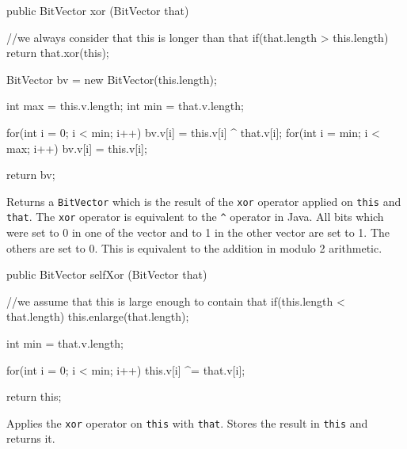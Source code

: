 \begin{code}

   public BitVector xor (BitVector that) \begin{hide} {
      //we always consider that this is longer than that
      if(that.length > this.length)
         return that.xor(this);

      BitVector bv = new BitVector(this.length);

      int max = this.v.length;
      int min = that.v.length;

      for(int i = 0; i < min; i++)
         bv.v[i] = this.v[i] ^ that.v[i];
      for(int i = min; i < max; i++)
         bv.v[i] = this.v[i];

      return bv;
   } \end{hide}
\end{code}
\begin{tabb} Returns a \texttt{BitVector} which is the result of the \texttt{xor}
  operator applied on \texttt{this} and \texttt{that}. The \texttt{xor} operator is
  equivalent to the \verb!^! operator in Java. All bits which were set to 0 in
  one of the vector and to 1 in the other vector are set to 1. The others
  are set to 0. This is equivalent to the addition in modulo 2 arithmetic.
\end{tabb}
\begin{htmlonly}
\end{htmlonly}
\begin{code}

   public BitVector selfXor (BitVector that) \begin{hide} {
      //we assume that this is large enough to contain that
      if(this.length < that.length)
         this.enlarge(that.length);

      int min = that.v.length;

      for(int i = 0; i < min; i++)
         this.v[i] ^= that.v[i];

      return this;
   } \end{hide}
\end{code}
\begin{tabb} Applies the \texttt{xor} operator on \texttt{this} with \texttt{that}.
  Stores the result in \texttt{this} and returns it.
\end{tabb}
\begin{htmlonly}
\end{htmlonly}

